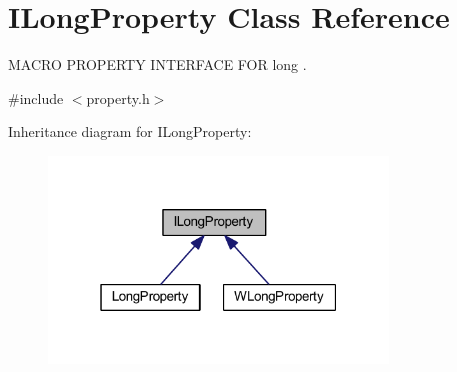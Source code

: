 \hypertarget{class_i_long_property}{\section{I\-Long\-Property Class Reference}
\label{class_i_long_property}
}


M\-A\-C\-R\-O P\-R\-O\-P\-E\-R\-T\-Y I\-N\-T\-E\-R\-F\-A\-C\-E F\-O\-R long .  




{\ttfamily \#include $<$property.\-h$>$}



Inheritance diagram for I\-Long\-Property\-:
\nopagebreak
\begin{figure}[H]
\begin{center}
\leavevmode
\includegraphics[width=256pt]{class_i_long_property__inherit__graph}
\end{center}
\end{figure}
